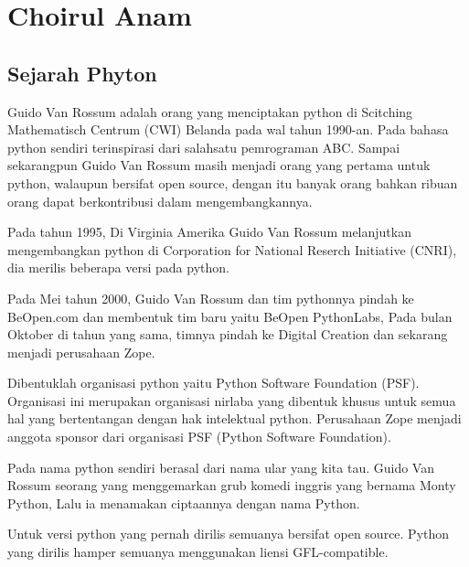 \section{Choirul Anam}
\subsection{Sejarah Phyton}
Guido Van Rossum adalah orang yang menciptakan python di Scitching Mathematisch Centrum (CWI) Belanda pada wal tahun 1990-an. Pada bahasa python  sendiri terinspirasi dari salahsatu pemrograman ABC. Sampai sekarangpun Guido Van Rossum masih menjadi orang yang pertama untuk python, walaupun bersifat open source, dengan itu banyak orang bahkan ribuan orang dapat berkontribusi dalam mengembangkannya.
\par
Pada tahun 1995, Di Virginia Amerika Guido Van Rossum melanjutkan mengembangkan python di Corporation for National Reserch Initiative (CNRI), dia merilis beberapa versi pada python.
\par
Pada Mei tahun 2000, Guido Van Rossum dan tim pythonnya pindah ke BeOpen.com dan membentuk tim baru yaitu BeOpen PythonLabs, Pada bulan Oktober di tahun yang sama, timnya pindah ke Digital Creation dan sekarang menjadi perusahaan Zope.
\par
Dibentuklah organisasi python yaitu Python Software Foundation (PSF). Organisasi ini merupakan organisasi nirlaba yang dibentuk khusus untuk semua hal yang bertentangan dengan hak intelektual python. Perusahaan Zope menjadi anggota sponsor dari organisasi PSF (Python Software Foundation).
\par
Pada nama python sendiri berasal dari nama ular yang kita tau. Guido Van Rossum seorang yang menggemarkan grub komedi inggris yang bernama Monty Python, Lalu ia menamakan ciptaannya dengan nama Python.
\par
Untuk versi python yang pernah dirilis semuanya bersifat open source. Python yang dirilis hamper semuanya menggunakan liensi GFL-compatible.
